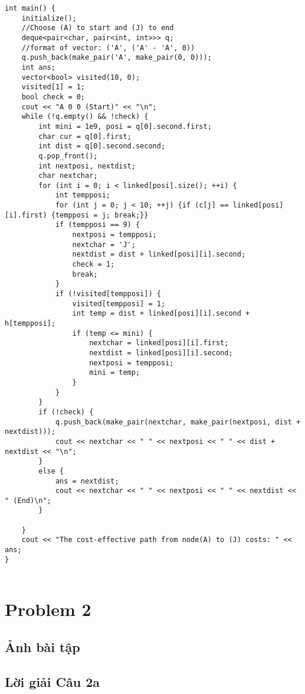 \documentclass{article}
\begin{document}
\begin{lstlisting}
int main() {
    initialize();
    //Choose (A) to start and (J) to end
    deque<pair<char, pair<int, int>>> q;
    //format of vector: ('A', ('A' - 'A', 0))
    q.push_back(make_pair('A', make_pair(0, 0)));
    int ans;
    vector<bool> visited(10, 0);
    visited[1] = 1;
    bool check = 0;
    cout << "A 0 0 (Start)" << "\n";
    while (!q.empty() && !check) {
        int mini = 1e9, posi = q[0].second.first;
        char cur = q[0].first;
        int dist = q[0].second.second;
        q.pop_front();
        int nextposi, nextdist;
        char nextchar;
        for (int i = 0; i < linked[posi].size(); ++i) {
            int tempposi;
            for (int j = 0; j < 10; ++j) {if (c[j] == linked[posi][i].first) {tempposi = j; break;}}
            if (tempposi == 9) {
                nextposi = tempposi;
                nextchar = 'J';
                nextdist = dist + linked[posi][i].second;
                check = 1;
                break;
            }
            if (!visited[tempposi]) {
                visited[tempposi] = 1;
                int temp = dist + linked[posi][i].second + h[tempposi];
                if (temp <= mini) {
                    nextchar = linked[posi][i].first;
                    nextdist = linked[posi][i].second;
                    nextposi = tempposi; 
                    mini = temp;
                }
            }
        }
        if (!check) {
            q.push_back(make_pair(nextchar, make_pair(nextposi, dist + nextdist)));
            cout << nextchar << " " << nextposi << " " << dist + nextdist << "\n";
        }
        else {
            ans = nextdist;
            cout << nextchar << " " << nextposi << " " << nextdist << " (End)\n";
        }
       
    }
    cout << "The cost-effective path from node(A) to (J) costs: " << ans;
}
	
\end{lstlisting}
\vspace{10pt}
\section{Problem 2}
\vspace{10pt}

\subsection{Ảnh bài tập}

\subsection{Lời giải Câu 2a}
\vspace{10pt}
\end{document}
